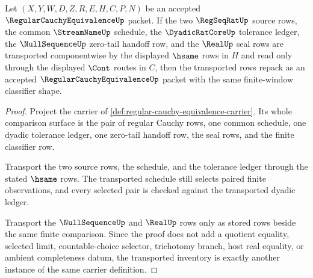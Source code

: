 \begin{theorem}
\label{thm:regularcauchyequivalence-refinement-transport}
Let $(X,Y,W,D,Z,R,E,H,C,P,N)$ be an accepted $\RegularCauchyEquivalenceUp$ packet. If the two $\RegSeqRatUp$ source rows, the common $\StreamNameUp$ schedule, the $\DyadicRatCoreUp$ tolerance ledger, the $\NullSequenceUp$ zero-tail handoff row, and the $\RealUp$ seal rows are transported componentwise by the displayed $\hsame$ rows in $H$ and read only through the displayed $\Cont$ routes in $C$, then the transported rows repack as an accepted $\RegularCauchyEquivalenceUp$ packet with the same finite-window classifier shape.
\end{theorem}
\begin{proof}
Project the carrier of \autoref{def:regular-cauchy-equivalence-carrier}. Its whole comparison surface is the pair of regular Cauchy rows, one common schedule, one dyadic tolerance ledger, one zero-tail handoff row, the seal rows, and the finite classifier row.

Transport the two source rows, the schedule, and the tolerance ledger through the stated $\hsame$ rows. The transported schedule still selects paired finite observations, and every selected pair is checked against the transported dyadic ledger.

Transport the $\NullSequenceUp$ and $\RealUp$ rows only as stored rows beside the same finite comparison. Since the proof does not add a quotient equality, selected limit, countable-choice selector, trichotomy branch, host real equality, or ambient completeness datum, the transported inventory is exactly another instance of the same carrier definition.
\end{proof}

